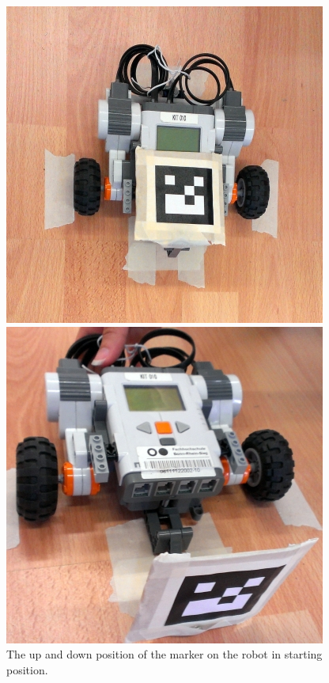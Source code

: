 \documentclass{scrartcl}
\begin{document}
\begin{figure}[H]
\centering
\begin{minipage}{.5\textwidth}
  \centering
  \includegraphics[width=.8\linewidth]{img/top_up.jpg}
\end{minipage}%
\begin{minipage}{.5\textwidth}
  \centering
  \includegraphics[width=.8\linewidth]{img/front_down.jpg}
\end{minipage}
\caption{The up and down position of the marker on the robot in starting position.}
\label{fig:updown}
\end{figure}
\end{document}
